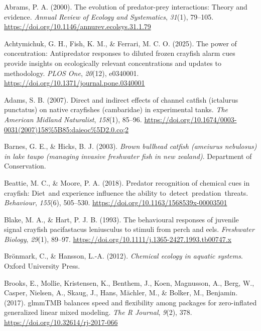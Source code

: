 \documentclass[
  letterpaper,
  DIV=11,
  numbers=noendperiod]{scrartcl}
\newlength{\cslhangindent}
\newenvironment{CSLReferences}[2] %
 {\begin{list}{}{%
  \setlength{\itemindent}{0pt}
  \setlength{\leftmargin}{0pt}
  \setlength{\parsep}{0pt}
  \ifodd #1
   \setlength{\leftmargin}{\cslhangindent}
   \setlength{\itemindent}{-1\cslhangindent}
  \fi
  \setlength{\itemsep}{#2\baselineskip}}}
 {\end{list}}
\begin{document}
\protect{}\label{refs}
\begin{CSLReferences}{1}{0}
Abrams, P. A. (2000). The evolution of predator-prey interactions:
Theory and evidence. \emph{Annual Review of Ecology and Systematics},
\emph{31}(1), 79--105.
\url{https://doi.org/10.1146/annurev.ecolsys.31.1.79}

Achtymichuk, G. H., Fish, K. M., \& Ferrari, M. C. O. (2025). The power
of concentration: Antipredator responses to diluted frozen crayfish
alarm cues provide insights on ecologically relevant concentrations and
updates to methodology. \emph{PLOS One}, \emph{20}(12), e0340001.
\url{https://doi.org/10.1371/journal.pone.0340001}

Adams, S. B. (2007). Direct and indirect effects of channel catfish
(ictalurus punctatus) on native crayfishes (cambaridae) in experimental
tanks. \emph{The American Midland Naturalist}, \emph{158}(1), 85--96.
\url{https://doi.org/10.1674/0003-0031(2007)158\%5B85:daieoc\%5D2.0.co;2}

Barnes, G. E., \& Hicks, B. J. (2003). \emph{Brown bullhead catfish
(ameiurus nebulosus) in lake taupo (managing invasive freshwater fish in
new zealand)}. Department of Conservation.

Beattie, M. C., \& Moore, P. A. (2018). Predator recognition of chemical
cues in crayfish: Diet~and experience influence the ability
to~detect~predation~threats. \emph{Behaviour}, \emph{155}(6), 505--530.
\url{https://doi.org/10.1163/1568539x-00003501}

Blake, M. A., \& Hart, P. J. B. (1993). The behavioural responses of
juvenile signal crayfish pacifastacus leniusculus to stimuli from perch
and eels. \emph{Freshwater Biology}, \emph{29}(1), 89--97.
\url{https://doi.org/10.1111/j.1365-2427.1993.tb00747.x}

Brönmark, C., \& Hansson, L.-A. (2012). \emph{Chemical ecology in
aquatic systems}. Oxford University Press.

Brooks, E., Mollie, Kristensen, K., Benthem, J., Koen, Magnusson, A.,
Berg, W., Casper, Nielsen, A., Skaug, J., Hans, Mächler, M., \& Bolker,
M., Benjamin. (2017). glmmTMB balances speed and flexibility among
packages for zero-inflated generalized linear mixed modeling. \emph{The
R Journal}, \emph{9}(2), 378. \url{https://doi.org/10.32614/rj-2017-066}


\end{CSLReferences}
\end{document}
